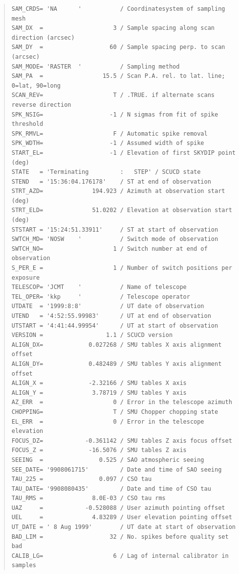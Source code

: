 \documentclass[twoside,11pt]{article}
\newenvironment{myquote}{\begin{quote}\begin{small}}{\end{small}\end{quote}}
\renewcommand{\_}{\texttt{\symbol{95}}}
\begin{document}
\begin{myquote}
\begin{verbatim}
SAM_CRDS= 'NA      '           / Coordinatesystem of sampling mesh
SAM_DX  =                    3 / Sample spacing along scan direction (arcsec)
SAM_DY  =                   60 / Sample spacing perp. to scan (arcsec)
SAM_MODE= 'RASTER  '           / Sampling method
SAM_PA  =                 15.5 / Scan P.A. rel. to lat. line; 0=lat, 90=long
SCAN_REV=                    T / .TRUE. if alternate scans reverse direction
SPK_NSIG=                   -1 / N sigmas from fit of spike threshold
SPK_RMVL=                    F / Automatic spike removal
SPK_WDTH=                   -1 / Assumed width of spike
START_EL=                   -1 / Elevation of first SKYDIP point (deg)
STATE   = 'Terminating         :   STEP' / SCUCD state
STEND   = '15:36:04.176178'    / ST at end of observation
STRT_AZD=              194.923 / Azimuth at observation start (deg)
STRT_ELD=              51.0202 / Elevation at observation start (deg)
STSTART = '15:24:51.33911'     / ST at start of observation
SWTCH_MD= 'NOSW    '           / Switch mode of observation
SWTCH_NO=                    1 / Switch number at end of observation
S_PER_E =                    1 / Number of switch positions per exposure
TELESCOP= 'JCMT    '           / Name of telescope
TEL_OPER= 'kkp     '           / Telescope operator
UTDATE  = '1999:8:8'           / UT date of observation
UTEND   = '4:52:55.99983'      / UT at end of observation
UTSTART = '4:41:44.99954'      / UT at start of observation
VERSION =                  1.1 / SCUCD version
ALIGN_DX=             0.027268 / SMU tables X axis alignment offset
ALIGN_DY=             0.482489 / SMU tables Y axis alignment offset
ALIGN_X =             -2.32166 / SMU tables X axis
ALIGN_Y =              3.78719 / SMU tables Y axis
AZ_ERR  =                    0 / Error in the telescope azimuth
CHOPPING=                    T / SMU Chopper chopping state
EL_ERR  =                    0 / Error in the telescope elevation
FOCUS_DZ=            -0.361142 / SMU tables Z axis focus offset
FOCUS_Z =             -16.5076 / SMU tables Z axis
SEEING  =                0.525 / SAO atmospheric seeing
SEE_DATE= '9908061715'         / Date and time of SAO seeing
TAU_225 =                0.097 / CSO tau
TAU_DATE= '9908080435'         / Date and time of CSO tau
TAU_RMS =              8.0E-03 / CSO tau rms
UAZ     =            -0.528088 / User azimuth pointing offset
UEL     =              4.83289 / User elevation pointing offset
UT_DATE = ' 8 Aug 1999'        / UT date at start of observation
BAD_LIM =                   32 / No. spikes before quality set bad
CALIB_LG=                    6 / Lag of internal calibrator in samples

\end{verbatim}
\end{myquote}
\end{document}
